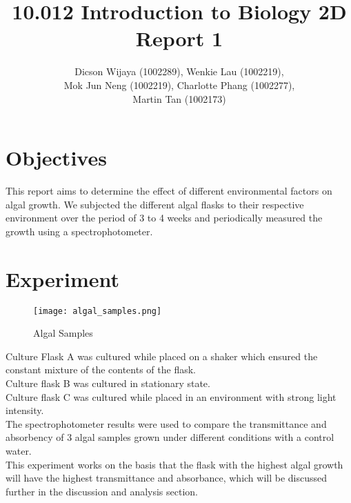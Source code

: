 \documentclass[12pt,a4paper]{IEEEtran}
\author{Dicson Wijaya (1002289), Wenkie Lau (1002219), \\ Mok Jun Neng (1002219), Charlotte Phang (1002277), \\ Martin Tan (1002173)}
\title{10.012 Introduction to Biology 2D Report 1}
\begin{document}
	
	\maketitle
	
	\section{Objectives} \vspace{-0.5in}
	This report aims to determine the effect of different environmental factors on algal growth. We subjected the different algal flasks to their respective environment over the period of 3 to 4 weeks and periodically measured the growth using a spectrophotometer. \vspace{-0.7in}
	
	\section{Experiment} \vspace{-0.8in}
	\begin{figure}[H]
		\begin{center}
			\texttt{[image: algal\_samples.png]}
			\caption{Algal Samples}
			\label{fig:algalsamples}
		\end{center}
	\end{figure} \vspace{-0.4in}
    Culture Flask A was cultured while placed on a shaker which ensured the constant mixture of the contents of the flask. \\
    
    Culture flask B was cultured in stationary state. \\
    
    Culture flask C was cultured while placed in an environment with strong light intensity. \\
    
    The spectrophotometer results were used to compare the transmittance and absorbency of 3 algal samples grown under different conditions with a control water. \\
    
    This experiment works on the basis that the flask with the highest algal growth will have the highest transmittance and absorbance, which will be discussed further in the discussion and analysis section.
    
\end{document}
